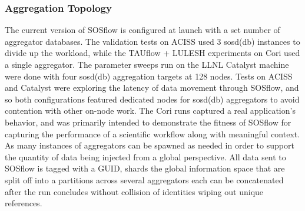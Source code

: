 \subsubsection{Aggregation Topology}
The current version of SOSflow is configured at launch with a set
number of aggregator databases.
%
The validation tests on ACISS used 3 sosd(db) instances to divide up
the workload, while the TAUflow + LULESH experiments on Cori used a
single aggregator.
%
The parameter sweeps run on the LLNL Catalyst machine were done with
four sosd(db) aggregation targets at 128 nodes.
%
Tests on ACISS and Catalyst were exploring the latency of data
movement through SOSflow, and so both configurations featured
dedicated nodes for sosd(db) aggregators to avoid contention
with other on-node work.
%
The Cori runs captured a real application's behavior, and was primarily
intended to demonstrate the fitness of SOSflow for capturing the
performance of a scientific workflow along with meaningful context.
%
As many instances of aggregators can be spawned as needed in order to
support the quantity of data being injected from a global
perspective.
%
All data sent to SOSflow is tagged with a GUID, shards the global
information space that are split off into a partitions across several
aggregators each can be concatenated after the run concludes without
collision of identities wiping out unique references.
%
%


